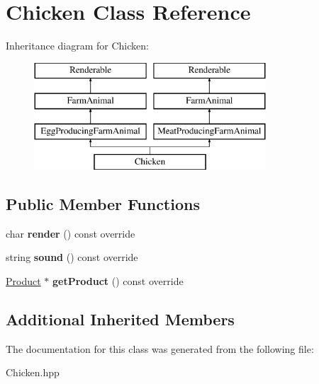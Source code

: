 \hypertarget{class_chicken}{}\section{Chicken Class Reference}
\label{class_chicken}
Inheritance diagram for Chicken\+:\begin{figure}[H]
\begin{center}
\leavevmode
\includegraphics[height=4.000000cm]{class_chicken}
\end{center}
\end{figure}
\subsection*{Public Member Functions}
\begin{DoxyCompactItemize}
\item 
\mbox{\label{class_chicken_a70b47acc255594170013d22b7ddc380a}} 
char {\bfseries render} () const override
\item 
\mbox{\label{class_chicken_a02ca558beb853b846e0d62d17cdeeb0a}} 
string {\bfseries sound} () const override
\item 
\mbox{\label{class_chicken_a9ba610aec45202dc74b3fd358d5ab528}} 
\mbox{\hyperlink{class_product}{Product}} $\ast$ {\bfseries get\+Product} () const override
\end{DoxyCompactItemize}
\subsection*{Additional Inherited Members}


The documentation for this class was generated from the following file\+:\begin{DoxyCompactItemize}
\item 
Chicken.\+hpp\end{DoxyCompactItemize}
